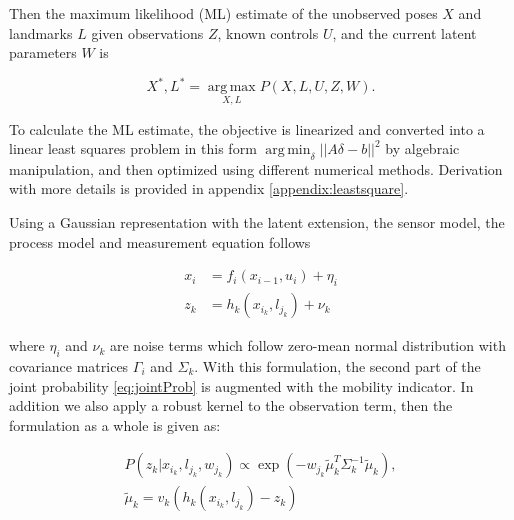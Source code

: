 Then the maximum likelihood (ML) estimate of the unobserved poses $X$ and landmarks $L$ given observations $Z$, known controls $U$, and the current latent parameters $W$ is

\begin{equation}
X^*, L^* = \operatorname*{arg\,max}_{X,L} P(X,L,U,Z,W).
\end{equation}

To calculate the ML estimate, the objective is linearized and converted into a linear least
squares problem in this form $\operatorname*{arg\,min}_{\delta} || A
\delta  - b ||^2$ by algebraic manipulation, and then optimized using
different numerical methods. Derivation with more details is provided in appendix \ref{appendix:leastsquare}.

Using a Gaussian representation with the latent extension, the sensor
model, the process model and measurement equation follows

\begin{equation}
\begin{aligned}
x_i &= f_i(x_{i-1}, u_i) + \eta_i \\
z_k &= h_k(x_{i_k}, l_{j_k}) + \nu_k
\end{aligned}
\label{eq:gaussRepresentation}
\end{equation}

where $\eta_i$ and $\nu_k$ are noise terms which follow zero-mean normal distribution with covariance matrices $\Gamma_i$ and $\Sigma_k$. With this formulation, the second part of the joint probability \ref{eq:jointProb} is augmented with the mobility indicator. In addition we also apply a robust kernel to the observation term, then the formulation as a whole is given as:

\begin{equation}
\begin{aligned}
P(z_k|x_{i_k}, l_{j_k}, w_{j_k})\propto \exp(-w_{j_k} \tilde{\mu}_k^T \Sigma_k^{-1} \tilde{\mu}_k),\\
 \tilde{\mu}_k = v_k(h_k(x_{i_k}, l_{j_k}) - z_k)
\label{eq:sensor}
\end{aligned}
\end{equation}

